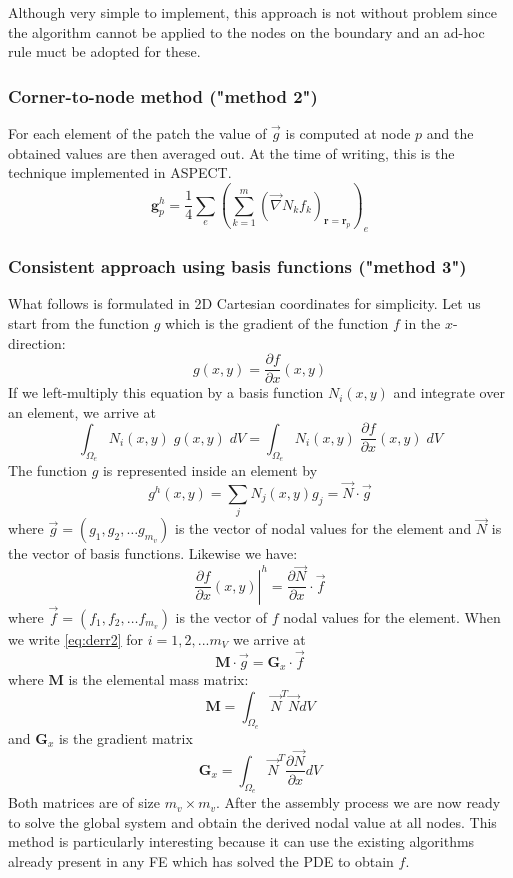 Although very simple to implement, this approach is not without problem since 
the algorithm cannot be applied to the nodes on the boundary and an ad-hoc 
rule muct be adopted for these. 



\subsubsection{Corner-to-node method ("method 2")}

For each element of the patch the value of $\vec g$ is computed at node $p$ and the obtained
values are then averaged out. At the time of writing, this is the technique implemented in  
ASPECT.
\[
\bm g_p^h = \frac{1}{4} \sum_{e} \left( \sum_{k=1}^m  (\vec\nabla N_k f_k)_{\bm r=\bm r_p} \right)_e
\]


\subsubsection{Consistent approach using basis functions ("method 3")}

What follows is formulated in 2D Cartesian coordinates for simplicity. 
Let us start from the function $g$ which is the gradient of the function $f$
in the $x$-direction:
\[
g(x,y) = \frac{\partial f}{\partial x}(x,y)
\]
If we left-multiply this equation by a basis function $N_i(x,y)$ 
and integrate over an element, we arrive at 
\begin{equation}
\int_{\Omega_e} N_i(x,y)\; g(x,y)\; dV =
\int_{\Omega_e} N_i(x,y)\; \frac{\partial f}{\partial x}(x,y)\; dV
\label{eq:derr2}
\end{equation}
The function $g$ is represented inside an element by
\[
g^h(x,y) = \sum_j N_j(x,y) g_j = \vec{N} \cdot \vec{g}
\]
where $\vec{g}=(g_1,g_2,\dots g_{m_v})$ is the vector of nodal values for the element
and $\vec{N}$ is the vector of basis functions.
Likewise we have:
\[
\left. \frac{\partial f}{\partial x}(x,y) \right|^h = \frac{\partial \vec{N}}{\partial x}\cdot \vec{f}
\]
where $\vec{f}=(f_1,f_2,\dots f_{m_v})$ is the vector of $f$ nodal values for the element.
When we write \eqref{eq:derr2} for $i=1,2,...m_V$ we arrive at
\[
{\bm M}\cdot \vec{g} = {\bm G}_x\cdot \vec{f}
\]
where ${\bm M}$ is the elemental mass matrix:
\[
{\bm M}=\int_{\Omega_e} \vec{N}^T \vec{N} dV
\]
and ${\bm G}_x$ is the gradient matrix 
\[
{\bm G}_x=\int_{\Omega_e} \vec{N}^T \frac{\partial \vec{N}}{\partial x} dV
\]
Both matrices are of size $m_v \times m_v$.
After the assembly process we are now ready to solve the global system and obtain
the derived nodal value at all nodes. 
This method is particularly interesting because it can use the existing algorithms 
already present in any FE which has solved the PDE to obtain $f$.  

